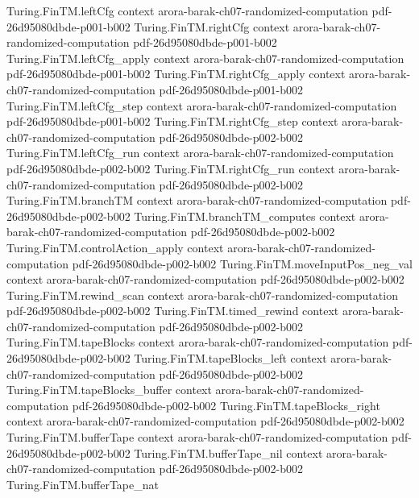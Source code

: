 \begin{theorem}
\proofstep
  {Turing.FinTM.leftCfg}
  {context}
  {arora-barak-ch07-randomized-computation}
  {pdf-26d95080dbde-p001-b002}
\proofstep
  {Turing.FinTM.rightCfg}
  {context}
  {arora-barak-ch07-randomized-computation}
  {pdf-26d95080dbde-p001-b002}
\proofstep
  {Turing.FinTM.leftCfg_apply}
  {context}
  {arora-barak-ch07-randomized-computation}
  {pdf-26d95080dbde-p001-b002}
\proofstep
  {Turing.FinTM.rightCfg_apply}
  {context}
  {arora-barak-ch07-randomized-computation}
  {pdf-26d95080dbde-p001-b002}
\proofstep
  {Turing.FinTM.leftCfg_step}
  {context}
  {arora-barak-ch07-randomized-computation}
  {pdf-26d95080dbde-p001-b002}
\proofstep
  {Turing.FinTM.rightCfg_step}
  {context}
  {arora-barak-ch07-randomized-computation}
  {pdf-26d95080dbde-p002-b002}
\proofstep
  {Turing.FinTM.leftCfg_run}
  {context}
  {arora-barak-ch07-randomized-computation}
  {pdf-26d95080dbde-p002-b002}
\proofstep
  {Turing.FinTM.rightCfg_run}
  {context}
  {arora-barak-ch07-randomized-computation}
  {pdf-26d95080dbde-p002-b002}
\proofstep
  {Turing.FinTM.branchTM}
  {context}
  {arora-barak-ch07-randomized-computation}
  {pdf-26d95080dbde-p002-b002}
\proofstep
  {Turing.FinTM.branchTM_computes}
  {context}
  {arora-barak-ch07-randomized-computation}
  {pdf-26d95080dbde-p002-b002}
\proofstep
  {Turing.FinTM.controlAction_apply}
  {context}
  {arora-barak-ch07-randomized-computation}
  {pdf-26d95080dbde-p002-b002}
\proofstep
  {Turing.FinTM.moveInputPos_neg_val}
  {context}
  {arora-barak-ch07-randomized-computation}
  {pdf-26d95080dbde-p002-b002}
\proofstep
  {Turing.FinTM.rewind_scan}
  {context}
  {arora-barak-ch07-randomized-computation}
  {pdf-26d95080dbde-p002-b002}
\proofstep
  {Turing.FinTM.timed_rewind}
  {context}
  {arora-barak-ch07-randomized-computation}
  {pdf-26d95080dbde-p002-b002}
\proofstep
  {Turing.FinTM.tapeBlocks}
  {context}
  {arora-barak-ch07-randomized-computation}
  {pdf-26d95080dbde-p002-b002}
\proofstep
  {Turing.FinTM.tapeBlocks_left}
  {context}
  {arora-barak-ch07-randomized-computation}
  {pdf-26d95080dbde-p002-b002}
\proofstep
  {Turing.FinTM.tapeBlocks_buffer}
  {context}
  {arora-barak-ch07-randomized-computation}
  {pdf-26d95080dbde-p002-b002}
\proofstep
  {Turing.FinTM.tapeBlocks_right}
  {context}
  {arora-barak-ch07-randomized-computation}
  {pdf-26d95080dbde-p002-b002}
\proofstep
  {Turing.FinTM.bufferTape}
  {context}
  {arora-barak-ch07-randomized-computation}
  {pdf-26d95080dbde-p002-b002}
\proofstep
  {Turing.FinTM.bufferTape_nil}
  {context}
  {arora-barak-ch07-randomized-computation}
  {pdf-26d95080dbde-p002-b002}
\proofstep
  {Turing.FinTM.bufferTape_nat}

\end{theorem}
